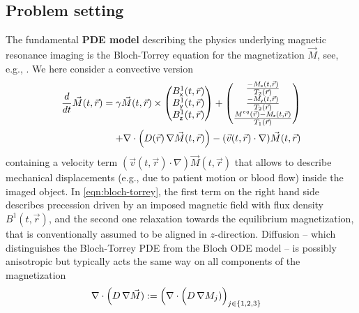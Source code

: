 \documentclass{ws-m3as}
\begin{document}
\subsection{Problem setting}\label{sec:setting}
The fundamental \textbf{PDE model} describing the physics underlying magnetic resonance imaging is the 
Bloch-Torrey equation for the magnetization $\vec M$,
see, e.g., \cite{bloch46,torrey56,Nishimura2010}.
We here consider a convective version 
\begin{equation}\label{eqn:bloch-torrey}
\begin{aligned}
    \frac{d}{dt} \vec M(t, \vec r) = \gamma \vec M(t, \vec r) \times  
\begin{pmatrix} B^1_{\mathsf{x}}(t, \vec r) \\ B^1_{\mathsf{y}}(t, \vec r) \\ B^1_{\mathsf{z}}(t, \vec r)  \end{pmatrix} 
    +  \begin{pmatrix} \frac{-M_{\mathsf{x}}(t, \vec r)}{T_2(\vec r)} \\ \frac{-M_{\mathsf{y}}(t, \vec r)}{T_2(\vec r)} \\ \frac{M^{eq}(\vec r) - M_{\mathsf{z}}(t, \vec r)}{T_1(\vec r)} \end{pmatrix}\\
    +\nabla\cdot\Bigl(D(\vec r) \, \nabla \vec M(t, \vec r)\Bigr) 
    -(\vec v(t,\vec r)\cdot\nabla)\vec M(t,\vec r)
\end{aligned}
\end{equation}
containing a velocity term $(\vec v(t,\vec r)\cdot\nabla)\vec M(t,\vec r)$ that allows to describe mechanical displacements (e.g., due to patient motion or blood flow) inside the imaged object.
In \eqref{eqn:bloch-torrey}, the first term on the right hand side describes precession driven by an imposed magnetic field with flux density $B^1(t, \vec r)$, and the second one relaxation towards the equilibrium magnetization, that is conventionally assumed to be aligned in $z$-direction. 
Diffusion -- which distinguishes the Bloch-Torrey PDE from the Bloch ODE model -- is possibly anisotropic but typically acts the same way on all components of the magnetization 
\[
\begin{aligned}
\nabla\cdot\Bigl(D \, \nabla \vec M)&:=\Bigl(\nabla\cdot\Bigl(D \, \nabla M_j)\Bigr)_{j\in\{1,2,3\}}
\end{aligned}
\]
\end{document}
